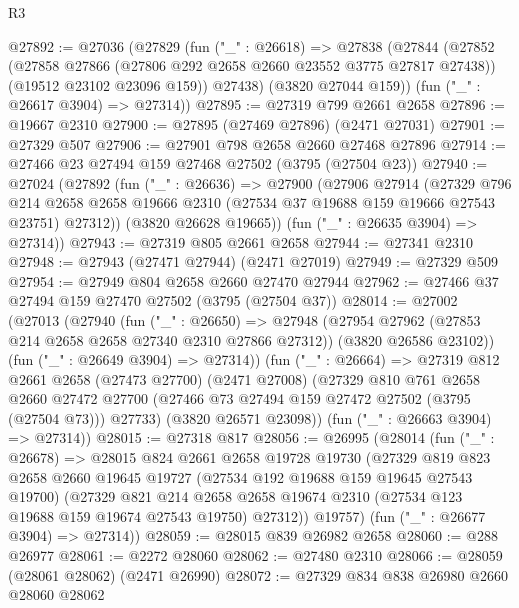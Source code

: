\begin{lexlean}{R3}
\begin{coremodule}
@27892 := @27036
    (@27829
      (fun ("_" : @26618) =>
      @27838
        (@27844
          (@27852
            (@27858 @27866 (@27806 @292 @2658 @2660 @23552 @3775 @27817 @27438))
            (@19512 @23102 @23096 @159))
          @27438)
        (@3820 @27044 @159))
      (fun ("_" : @26617 @3904) => @27314))
@27895 := @27319 @799 @2661 @2658
@27896 := @19667 @2310
@27900 := @27895 (@27469 @27896) (@2471 @27031)
@27901 := @27329 @507
@27906 := @27901 @798 @2658 @2660 @27468 @27896
@27914 := @27466 @23 @27494 @159 @27468 @27502 (@3795 (@27504 @23))
@27940 := @27024
    (@27892
      (fun ("_" : @26636) =>
      @27900
        (@27906
          @27914
          (@27329
            @796
            @214
            @2658
            @2658
            @19666
            @2310
            (@27534 @37 @19688 @159 @19666 @27543 @23751)
            @27312))
        (@3820 @26628 @19665))
      (fun ("_" : @26635 @3904) => @27314))
@27943 := @27319 @805 @2661 @2658
@27944 := @27341 @2310
@27948 := @27943 (@27471 @27944) (@2471 @27019)
@27949 := @27329 @509
@27954 := @27949 @804 @2658 @2660 @27470 @27944
@27962 := @27466 @37 @27494 @159 @27470 @27502 (@3795 (@27504 @37))
@28014 := @27002
    (@27013
      (@27940
        (fun ("_" : @26650) =>
        @27948
          (@27954 @27962 (@27853 @214 @2658 @2658 @27340 @2310 @27866 @27312))
          (@3820 @26586 @23102))
        (fun ("_" : @26649 @3904) => @27314))
      (fun ("_" : @26664) =>
      @27319
        @812
        @2661
        @2658
        (@27473 @27700)
        (@2471 @27008)
        (@27329
          @810
          @761
          @2658
          @2660
          @27472
          @27700
          (@27466 @73 @27494 @159 @27472 @27502 (@3795 (@27504 @73)))
          @27733)
        (@3820 @26571 @23098))
      (fun ("_" : @26663 @3904) => @27314))
@28015 := @27318 @817
@28056 := @26995
    (@28014
      (fun ("_" : @26678) =>
      @28015
        @824
        @2661
        @2658
        @19728
        @19730
        (@27329
          @819
          @823
          @2658
          @2660
          @19645
          @19727
          (@27534 @192 @19688 @159 @19645 @27543 @19700)
          (@27329
            @821
            @214
            @2658
            @2658
            @19674
            @2310
            (@27534 @123 @19688 @159 @19674 @27543 @19750)
            @27312))
        @19757)
      (fun ("_" : @26677 @3904) => @27314))
@28059 := @28015 @839 @26982 @2658
@28060 := @288 @26977
@28061 := @2272 @28060
@28062 := @27480 @2310
@28066 := @28059 (@28061 @28062) (@2471 @26990)
@28072 := @27329 @834 @838 @26980 @2660 @28060 @28062

\end{coremodule}
\end{lexlean}
